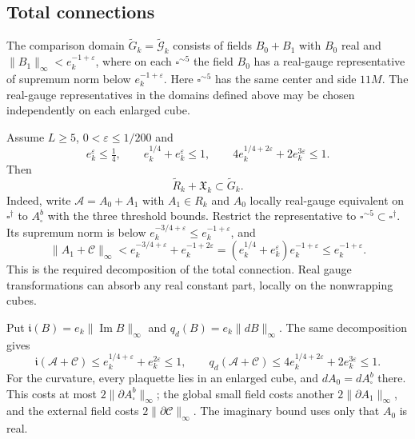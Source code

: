 \subsection{Total connections}
\label{subsec:rg-total-connection-domain}

The comparison domain $\widetilde G_k=\widetilde{\mathcal G}_k$ consists of fields $B_0+B_1$
with $B_0$ real and $\|B_1\|_\infty<e_k^{-1+\varepsilon}$,
where on each $\square^{\sim5}$ the field $B_0$ has a real-gauge
representative of supremum norm below $e_k^{-1+\varepsilon}$.
Here $\square^{\sim5}$ has the same center and side $11M$.
The real-gauge representatives in the domains defined above may
be chosen independently on each enlarged cube.

Assume $L\ge5$, $0<\varepsilon\le1/200$ and
\begin{equation}\label{eq:rg-domain-charge-conditions}
 e_k^\varepsilon\le\tfrac14,\qquad
 e_k^{1/4}+e_k^\varepsilon\le1,\qquad
 4e_k^{1/4+2\varepsilon}+2e_k^{3\varepsilon}\le1.
\end{equation}
Then
\begin{equation}\label{eq:rg-total-domain-inclusion}
 \widetilde R_k+\mathfrak X_k\subset\widetilde G_k.
\end{equation}
Indeed, write $\mathscr A=A_0+A_1$ with $A_1\in R_k$ and
$A_0$ locally real-gauge equivalent on $\square^\dagger$ to
$A_\square^b$ with the three threshold bounds. Restrict the
representative to $\square^{\sim5}\subset\square^\dagger$.
Its supremum norm is below
$e_k^{-3/4+\varepsilon}\le e_k^{-1+\varepsilon}$, and
\[
 \|A_1+\mathscr C\|_\infty
 <e_k^{-3/4+\varepsilon}+e_k^{-1+2\varepsilon}
 =(e_k^{1/4}+e_k^\varepsilon)e_k^{-1+\varepsilon}
 \le e_k^{-1+\varepsilon}.
\]
This is the required decomposition of the total connection.
Real gauge transformations can absorb any real constant part,
locally on the nonwrapping cubes.

Put $\mathfrak i(B)=e_k\|\operatorname{Im}B\|_\infty$ and
$q_d(B)=e_k\|dB\|_\infty$. The same decomposition gives
\begin{equation}\label{eq:rg-total-imaginary-curvature-bounds}
 \mathfrak i(\mathscr A+\mathscr C)
       \le e_k^{1/4+\varepsilon}+e_k^{2\varepsilon}\le1,
 \qquad
 q_d(\mathscr A+\mathscr C)
       \le4e_k^{1/4+2\varepsilon}+2e_k^{3\varepsilon}\le1.
\end{equation}
For the curvature, every plaquette lies in an enlarged cube,
and $dA_0=dA_\square^b$ there. This costs at most
$2\|\partial A_\square^b\|_\infty$; the global small field
costs another $2\|\partial A_1\|_\infty$, and the external
field costs $2\|\partial\mathscr C\|_\infty$.
The imaginary bound uses only that $A_0$ is real.

